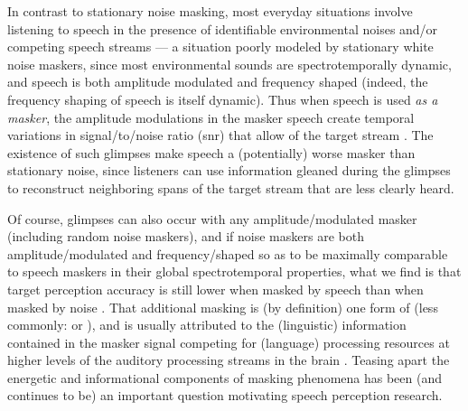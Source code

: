\label{par:Glimpsing}In contrast to stationary noise masking, most everyday situations involve listening to speech in the presence of identifiable environmental noises and/or competing speech streams — a situation poorly modeled by stationary white noise maskers, since most environmental sounds are spectrotemporally dynamic, and speech is both amplitude modulated and frequency shaped (indeed, the frequency shaping of speech is itself dynamic).  Thus when speech is used \emph{as a masker}, the amplitude modulations in the masker speech create temporal variations in signal\-/to\-/noise ratio (\ac{snr}) that allow  of the target stream \citep[\etseq]{FestenPlomp1990}.  The existence of such glimpses make speech a (potentially) worse masker than stationary noise, since listeners can use information gleaned during the glimpses to reconstruct neighboring spans of the target stream that are less clearly heard.\footnotemark{}

Of course, glimpses can also occur with any amplitude\-/modulated masker (including random noise maskers), and if noise maskers are both amplitude\-/modulated and frequency\-/shaped so as to be maximally comparable to speech maskers in their global spectrotemporal properties, what we find is that target perception accuracy is still lower when masked by speech than when masked by noise \citep[\intal]{CarhartEtAl1969,LewisEtAl1988,SimpsonCooke2005}.  That additional masking is (by definition) one form of  (less commonly:  or ), and is usually attributed to the (linguistic) information contained in the masker signal competing for (language) processing resources at higher levels of the auditory processing streams in the brain \citep{DurlachEtAl2003a}.  Teasing apart the energetic and informational components of masking phenomena has been (and continues to be) an important question motivating speech perception research.

